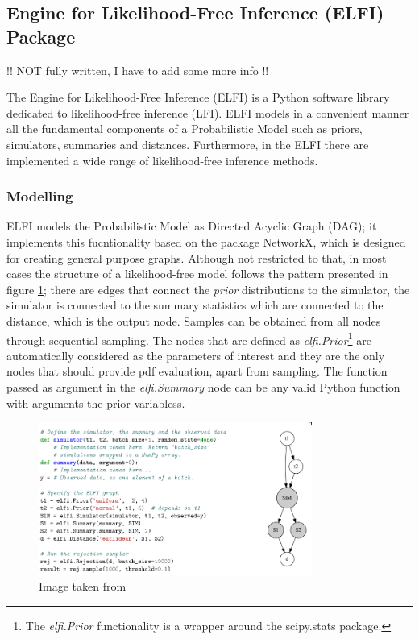 \subsection{Engine for Likelihood-Free Inference (ELFI) Package}
\label{subsec:elfi}

!! NOT fully written, I have to add some more info !!

The Engine for Likelihood-Free Inference (ELFI) \cite{1708.00707} is a Python software library dedicated to likelihood-free inference (LFI). ELFI models in a convenient manner all the fundamental components of a Probabilistic Model such as priors, simulators, summaries and distances. Furthermore, in the ELFI there are implemented a wide range of likelihood-free inference methods.

\subsubsection{Modelling}
\label{sec:modelling}

ELFI models the Probabilistic Model as Directed Acyclic Graph (DAG);
it implements this fucntionality based on the package NetworkX, which
is designed for creating general purpose graphs. Although not
restricted to that, in most cases the structure of a likelihood-free
model follows the pattern presented in figure \ref{fig:elfi-model};
there are edges that connect the \textit{prior} distributions to the
simulator, the simulator is connected to the summary statistics which
are connected to the distance, which is the output node. Samples can
be obtained from all nodes through sequential sampling. The nodes that
are defined as \textit{elfi.Prior}\footnote{The \textit{elfi.Prior}
  functionality is a wrapper around the scipy.stats package.} are
automatically considered as the parameters of interest and they are
the only nodes that should provide pdf evaluation, apart from
sampling. The function passed as argument in the \textit{elfi.Summary}
node can be any valid Python function with arguments the prior
variabless.

\begin{figure}[!ht]
    \begin{center}
      \includegraphics[width=0.8\textwidth]{./images/chapter2/elfi.png}
    \end{center}
    \caption{Image taken from \cite{1708.00707}}
    \label{fig:elfi-model}
\end{figure}


